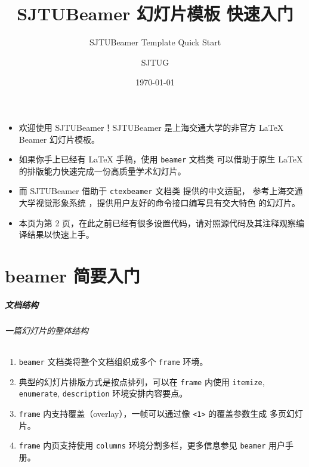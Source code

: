 \documentclass[
    aspectratio=169,  %
]{ctexbeamer}
\title{SJTUBeamer 幻灯片模板 快速入门}
\subtitle{SJTUBeamer Template Quick Start}
\author{SJTUG}
\institute[SJTUG]{上海交通大学 Linux 用户组}
\date{\today}
\begin{document}
\maketitle

\begin{frame}
  \begin{itemize}
    \item 欢迎使用 SJTUBeamer！SJTUBeamer 是上海交通大学的非官方 \LaTeX{} Beamer 幻灯片模板。

    \item 如果你手上已经有 \LaTeX{} 手稿，使用 \texttt{beamer} 文档类 
          可以借助于原生 \LaTeX{} 的排版能力快速完成一份高质量学术幻灯片。

    \item 而 SJTUBeamer 借助于 \texttt{ctexbeamer} 文档类  提供的中文适配，
          参考上海交通大学视觉形象系统 ，提供用户友好的命令接口编写具有交大特色
          的幻灯片。

    \item 本页为第 2 页，在此之前已经有很多设置代码，请对照源代码及其注释观察编译结果以快速上手。
  \end{itemize}
\end{frame}

\part{beamer 简要入门}

\begin{frame}
  \frametitle{文档结构}
  \framesubtitle{一篇幻灯片的整体结构}

  \begin{enumerate}
    \item \texttt{beamer} 文档类将整个文档组织成多个 \texttt{frame} 环境。
    \item 典型的幻灯片排版方式是按点排列，可以在 \texttt{frame} 内使用 \texttt{itemize},
          \texttt{enumerate}, \texttt{description} 环境安排内容要点。
    \item \texttt{frame} 内支持覆盖（overlay），一帧可以通过像 \texttt{<1>} 的覆盖参数生成
          多页幻灯片。
    \item \texttt{frame} 内页支持使用 \texttt{columns} 环境分割多栏，更多信息参见
          \texttt{beamer} 用户手册\cite{beamerman}。
  \end{enumerate}

\end{frame}
\end{document}
